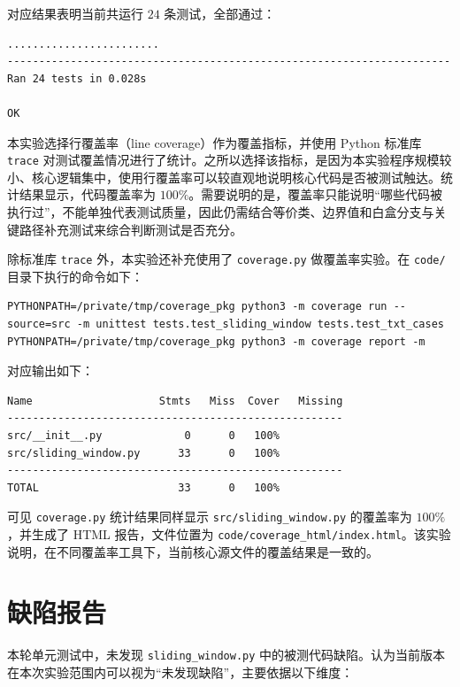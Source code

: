 \documentclass[a4paper,UTF8,fontset=none]{ctexart}
\begin{document}
对应结果表明当前共运行 $24$ 条测试，全部通过：

\begin{lstlisting}
........................
----------------------------------------------------------------------
Ran 24 tests in 0.028s

OK
\end{lstlisting}

本实验选择行覆盖率（line coverage）作为覆盖指标，并使用 Python 标准库 \texttt{trace} 对测试覆盖情况进行了统计。之所以选择该指标，是因为本实验程序规模较小、核心逻辑集中，使用行覆盖率可以较直观地说明核心代码是否被测试触达。统计结果显示，代码覆盖率为 $100\%$。需要说明的是，覆盖率只能说明“哪些代码被执行过”，不能单独代表测试质量，因此仍需结合等价类、边界值和白盒分支与关键路径补充测试来综合判断测试是否充分。

除标准库 \texttt{trace} 外，本实验还补充使用了 \texttt{coverage.py} 做覆盖率实验。在 \texttt{code/} 目录下执行的命令如下：

\begin{lstlisting}
PYTHONPATH=/private/tmp/coverage_pkg python3 -m coverage run --source=src -m unittest tests.test_sliding_window tests.test_txt_cases
PYTHONPATH=/private/tmp/coverage_pkg python3 -m coverage report -m
\end{lstlisting}

对应输出如下：

\begin{lstlisting}
Name                    Stmts   Miss  Cover   Missing
-----------------------------------------------------
src/__init__.py             0      0   100%
src/sliding_window.py      33      0   100%
-----------------------------------------------------
TOTAL                      33      0   100%
\end{lstlisting}

可见 \texttt{coverage.py} 统计结果同样显示 \texttt{src/sliding\_window.py} 的覆盖率为 $100\%$，并生成了 HTML 报告，文件位置为 \texttt{code/coverage\_html/index.html}。该实验说明，在不同覆盖率工具下，当前核心源文件的覆盖结果是一致的。

\section{缺陷报告}

本轮单元测试中，未发现 \texttt{sliding\_window.py} 中的被测代码缺陷。认为当前版本在本次实验范围内可以视为“未发现缺陷”，主要依据以下维度：
\end{document}
